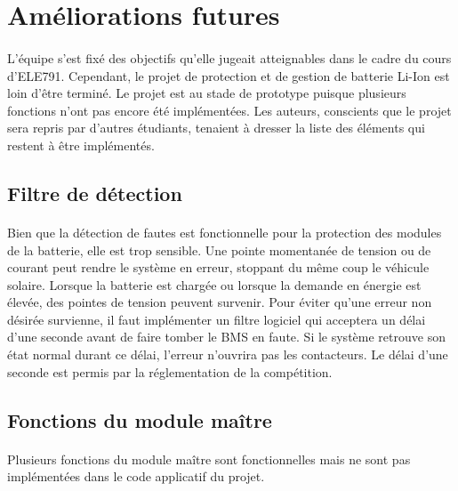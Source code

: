 \section{Améliorations futures}

	\paragraph{}
	L'équipe s'est fixé des objectifs qu'elle jugeait atteignables dans le cadre du cours d'ELE791. Cependant, le projet de protection et de gestion de batterie Li-Ion est loin d'être terminé. Le projet est au stade de prototype puisque plusieurs fonctions n'ont pas encore été implémentées. Les auteurs, conscients que le projet sera repris par d'autres étudiants, tenaient à dresser la liste des éléments qui restent à être implémentés.

	\subsection{Filtre de détection}

		\paragraph{}
		Bien que la détection de fautes est fonctionnelle pour la protection des modules de la batterie, elle est trop sensible. Une pointe momentanée de tension ou de courant peut rendre le système en erreur, stoppant du même coup le véhicule solaire. Lorsque la batterie est chargée ou lorsque la demande en énergie est élevée, des pointes de tension peuvent survenir. Pour éviter qu'une erreur non désirée survienne, il faut implémenter un filtre logiciel qui acceptera un délai d'une seconde avant de faire tomber le BMS en faute. Si le système retrouve son état normal durant ce délai, l'erreur n'ouvrira pas les contacteurs. Le délai d'une seconde est permis par la réglementation de la compétition.

	\subsection{Fonctions du module maître}

		\paragraph{}
		Plusieurs fonctions du module maître sont fonctionnelles mais ne sont pas implémentées dans le code applicatif du projet.

